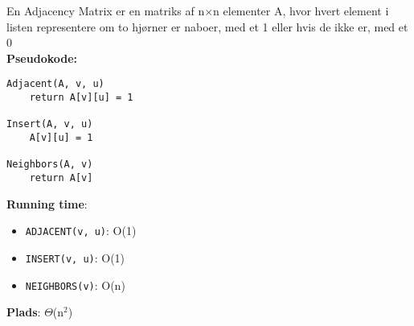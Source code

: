 En Adjacency Matrix er en matriks af n$\times$n elementer A, hvor hvert element i listen representere om to hjørner er naboer, med et 1 eller hvis de ikke er, med et 0\\
\textbf{Pseudokode:}
\begin{lstlisting}[frame=single, mathescape=true]
Adjacent(A, v, u)
	return A[v][u] = 1

Insert(A, v, u)
	A[v][u] = 1

Neighbors(A, v)
	return A[v]
\end{lstlisting}
\textbf{Running time}:
\begin{itemize}
	\item \texttt{ADJACENT(v, u)}: O(1)
	\item \texttt{INSERT(v, u)}: O(1)
	\item \texttt{NEIGHBORS(v)}: O(n)
\end{itemize}
\textbf{Plads}: $\Theta$(n$^2$)
